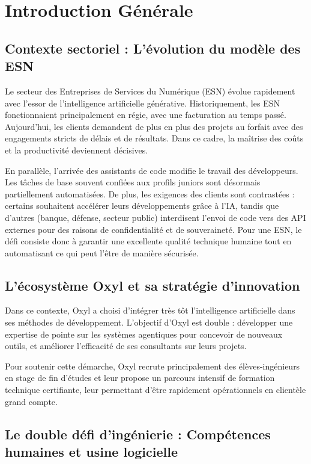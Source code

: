 \documentclass{tnreport}
\def\reportCompany{Oxyl} %
\begin{document}
\chapter{Introduction Générale}
\label{chap:introduction}

\section*{Contexte sectoriel : L'évolution du modèle des ESN}

Le secteur des Entreprises de Services du Numérique (ESN) évolue rapidement avec l'essor de l'intelligence artificielle générative. Historiquement, les ESN fonctionnaient principalement en régie, avec une facturation au temps passé. Aujourd'hui, les clients demandent de plus en plus des projets au forfait avec des engagements stricts de délais et de résultats. Dans ce cadre, la maîtrise des coûts et la productivité deviennent décisives.

En parallèle, l'arrivée des assistants de code modifie le travail des développeurs. Les tâches de base souvent confiées aux profils juniors sont désormais partiellement automatisées. De plus, les exigences des clients sont contrastées : certains souhaitent accélérer leurs développements grâce à l'IA, tandis que d'autres (banque, défense, secteur public) interdisent l'envoi de code vers des API externes pour des raisons de confidentialité et de souveraineté. Pour une ESN, le défi consiste donc à garantir une excellente qualité technique humaine tout en automatisant ce qui peut l'être de manière sécurisée.

\section*{L'écosystème Oxyl et sa stratégie d'innovation}

Dans ce contexte, \reportCompany{} a choisi d'intégrer très tôt l'intelligence artificielle dans ses méthodes de développement. L'objectif d'Oxyl est double : développer une expertise de pointe sur les systèmes agentiques pour concevoir de nouveaux outils, et améliorer l'efficacité de ses consultants sur leurs projets.

Pour soutenir cette démarche, Oxyl recrute principalement des élèves-ingénieurs en stage de fin d'études et leur propose un parcours intensif de formation technique certifiante, leur permettant d'être rapidement opérationnels en clientèle grand compte.

\section*{Le double défi d'ingénierie : Compétences humaines et usine logicielle}
\end{document}
